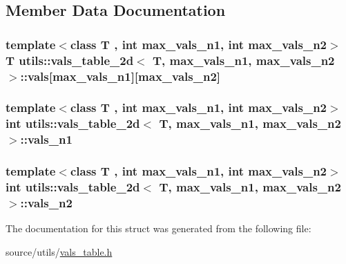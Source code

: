 \subsection{Member Data Documentation}
\hypertarget{structutils_1_1vals__table__2d_aa019454355b7fbdf9d0c35b035a94c5c}{
\subsubsection[{vals}]{\setlength{\rightskip}{0pt plus 5cm}template$<$class T , int max\-\_\-vals\-\_\-n1, int max\-\_\-vals\-\_\-n2$>$ T {\bf utils\-::vals\-\_\-table\-\_\-2d}$<$ T, max\-\_\-vals\-\_\-n1, max\-\_\-vals\-\_\-n2 $>$\-::vals\mbox{[}max\-\_\-vals\-\_\-n1\mbox{]}\mbox{[}max\-\_\-vals\-\_\-n2\mbox{]}}}\label{structutils_1_1vals__table__2d_aa019454355b7fbdf9d0c35b035a94c5c}
\hypertarget{structutils_1_1vals__table__2d_a842f3a4304ebee55a51807eaa2d875ed}{
\subsubsection[{vals\-\_\-n1}]{\setlength{\rightskip}{0pt plus 5cm}template$<$class T , int max\-\_\-vals\-\_\-n1, int max\-\_\-vals\-\_\-n2$>$ {\bf int} {\bf utils\-::vals\-\_\-table\-\_\-2d}$<$ T, max\-\_\-vals\-\_\-n1, max\-\_\-vals\-\_\-n2 $>$\-::vals\-\_\-n1}}\label{structutils_1_1vals__table__2d_a842f3a4304ebee55a51807eaa2d875ed}
\hypertarget{structutils_1_1vals__table__2d_acb7d1fe6f6b1a9e9fffac100c0496e0f}{
\subsubsection[{vals\-\_\-n2}]{\setlength{\rightskip}{0pt plus 5cm}template$<$class T , int max\-\_\-vals\-\_\-n1, int max\-\_\-vals\-\_\-n2$>$ {\bf int} {\bf utils\-::vals\-\_\-table\-\_\-2d}$<$ T, max\-\_\-vals\-\_\-n1, max\-\_\-vals\-\_\-n2 $>$\-::vals\-\_\-n2}}\label{structutils_1_1vals__table__2d_acb7d1fe6f6b1a9e9fffac100c0496e0f}


The documentation for this struct was generated from the following file\-:\begin{DoxyCompactItemize}
\item 
source/utils/\hyperlink{vals__table_8h}{vals\-\_\-table.\-h}\end{DoxyCompactItemize}
